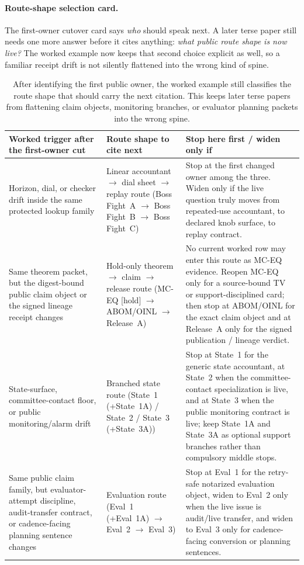 \documentclass[11pt]{article}
\begin{document}
\paragraph{Route-shape selection card.}
The first-owner cutover card says \emph{who} should speak next.
A later terse paper still needs one more answer before it cites anything: \emph{what public route shape is now live?}
The worked example now keeps that second choice explicit as well, so a familiar receipt drift is not silently flattened into the wrong kind of spine.\cite{series:bossfightA,series:bossfightB,series:bossfightC,series:mceq,series:abomoinl,series:releaseproperty,series:state1,series:state1A,series:mucc,series:state3,series:state3A,series:eval1A,series:eval2,series:eval3}

\begin{table}[t]
\centering
\small
\begin{tabularx}{\linewidth}{@{}Y Y Y@{}}
\toprule
Worked trigger after the first-owner cut & Route shape to cite next & Stop here first / widen only if \\
\midrule
Horizon, dial, or checker drift inside the same protected lookup family & Linear accountant $\to$ dial sheet $\to$ replay route (Boss Fight~A $\to$ Boss Fight~B $\to$ Boss Fight~C) & Stop at the first changed owner among the three. Widen only if the live question truly moves from repeated-use accountant, to declared knob surface, to replay contract. \\
Same theorem packet, but the digest-bound public claim object or the signed lineage receipt changes & Hold-only theorem $\to$ claim $\to$ release route (MC-EQ [hold] $\to$ ABOM/OINL $\to$ Release~A) & No current worked row may enter this route as MC-EQ evidence. Reopen MC-EQ only for a source-bound TV or support-disciplined card; then stop at ABOM/OINL for the exact claim object and at Release~A only for the signed publication / lineage verdict. \\
State-surface, committee-contact floor, or public monitoring/alarm drift & Branched state route (State~1 (+State~1A) / State~2 / State~3 (+State~3A)) & Stop at State~1 for the generic state accountant, at State~2 when the committee-contact specialization is live, and at State~3 when the public monitoring contract is live; keep State~1A and State~3A as optional support branches rather than compulsory middle stops. \\
Same public claim family, but evaluator-attempt discipline, audit-transfer contract, or cadence-facing planning sentence changes & Evaluation route (Eval~1 (+Eval~1A) $\to$ Eval~2 $\to$ Eval~3) & Stop at Eval~1 for the retry-safe notarized evaluation object, widen to Eval~2 only when the live issue is audit/live transfer, and widen to Eval~3 only for cadence-facing conversion or planning sentences. \\
\bottomrule
\end{tabularx}
\caption{After identifying the first public owner, the worked example still classifies the route shape that should carry the next citation. This keeps later terse papers from flattening claim objects, monitoring branches, or evaluator planning packets into the wrong spine.}
\label{tab:workedexample-route-shape-card}
\end{table}
\end{document}
